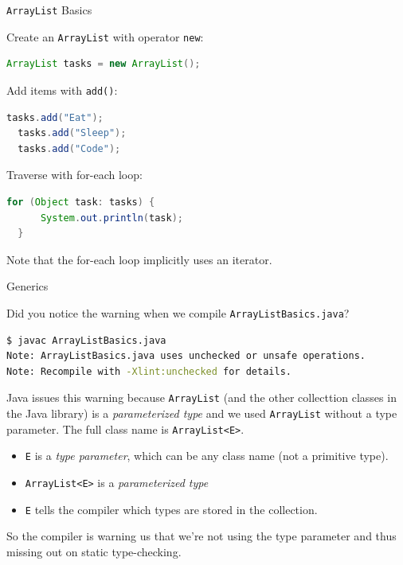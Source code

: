\documentclass{beamer}
\begin{document}
\begin{frame}[fragile]{{\tt ArrayList} Basics}


Create an {\tt ArrayList} with operator {\tt new}:
\begin{lstlisting}[language=Java]
  ArrayList tasks = new ArrayList();
\end{lstlisting}
Add items with {\tt add()}:
\begin{lstlisting}[language=Java]
  tasks.add("Eat");
  tasks.add("Sleep");
  tasks.add("Code");
\end{lstlisting}
Traverse with for-each loop:
\begin{lstlisting}[language=Java]
  for (Object task: tasks) {
      System.out.println(task);
  }
\end{lstlisting}

Note that the for-each loop implicitly uses an iterator.

\end{frame}

\begin{frame}[fragile]{Generics}


Did you notice the warning when we compile {\tt ArrayListBasics.java}?
\begin{lstlisting}[language=bash]
$ javac ArrayListBasics.java
Note: ArrayListBasics.java uses unchecked or unsafe operations.
Note: Recompile with -Xlint:unchecked for details.
\end{lstlisting}
Java issues this warning because {\tt ArrayList} (and the other collecttion classes in the Java library) is a {\it parameterized type} and we used {\tt ArrayList} without a type parameter.  The full class name is {\tt ArrayList<E>}.
\begin{itemize}
\item {\tt E} is a {\it type parameter}, which can be any class name (not a primitive type).
\item {\tt ArrayList<E>} is a {\it parameterized type}
\item {\tt E} tells the compiler which types are stored in the collection.
\end{itemize}
So the compiler is warning us that we're not using the type parameter and thus missing out on static type-checking.

\end{frame}
\end{document}
